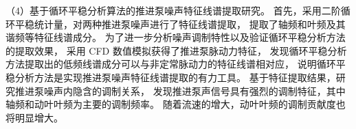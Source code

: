 （4）基于循环平稳分析算法的推进泵噪声特征线谱提取研究。
首先，采用二阶循环平稳统计量，对两种推进泵噪声进行了特征线谱提取，
提取了轴频和叶频及其谐频等特征线谱成分。
为了进一步分析噪声调制特性以及验证循环平稳分析方法的提取效果，
采用 CFD 数值模拟获得了推进泵脉动力特征，
发现循环平稳分析方法提取出的低频线谱成分可以与非定常脉动力的特征线谱相对应，
说明循环平稳分析方法是实现推进泵噪声特征线谱提取的有力工具。
基于特征提取结果，研究推进泵噪声内隐含的调制关系，
发现推进泵声信号具有强烈的调制特征，其中轴频和动叶叶频为主要的调制频率。
随着流速的增大，动叶叶频的调制贡献度也将明显增大。
\begin{comment}
（1）基于LabVIEW开发了推进泵噪声测试与分析系统。
其中涵盖了传感器、数据采集等硬件设计，以及信号分析、显示、存储等软件模块的设计。
该系统支持同步对多通道传感器信号实时采集，各通道信号同时分析、显示及存储，
具有操作简单、经济高效等优势。
基于系统的信号分析模块，可实现对噪声的频段能量分布特点、特征频段总声压量级、频谱特征等声纹特征分析。

（2）以紧凑型前置导叶的单级推进泵和新型结构的双级推进泵为研究对象，
在大型空泡水洞中对其分别开展了噪声试验。
在考虑背景噪声影响的基础上，
研究不同工况下推进泵噪声的声纹特征变化，
以及流速等与噪声的声学关联性。
结果表明，中低频段噪声对推进泵噪声有显著贡献。
噪声中低频段、高频段和全频段的总声压级随着流速的增大而增大，
流速变化对推进泵噪声能量分布和总声压级影响主要体现在中低频段。
两种形式的推进泵噪声频谱均表现为中低频线谱噪声、中低频宽带噪声和高频宽带噪声。

（3）开展了推进泵声信号的特性研究。
结合推进泵声信号产生的机理和声信号特征，对声信号进行了
组分分析。推进泵声信号成分主要包括确定性信号分量、调制信号分量和环境噪声信号分量。
基于推进泵声信号的循环平稳特性和各组分的特点，
对匀速运转工况下的无空化声信号建立了调幅调制信号模型，
采用循环平稳分析方法对声信号的仿真模型进行了研究，
验证了循环平稳解调算法提取多组分调制频率的有效性和良好的抗噪性能。
 
（4）推进泵噪声的特征线谱提取和分析。针对噪声特征线谱提取的需求，
基于循环平稳分析方法实现了推进泵低频线谱的提取。
为了验证循环平稳分析方法提取特征线谱的可行性，采用 CFD 数
值模拟获得了推进泵脉动力特征，
结果表明循环平稳分析方法提取出的低频线谱成分可以和非定常脉动力的特征线谱对应起来。
同时，对推进泵噪声的调制特性进行了研究，
发现推进泵声信号具有强烈的调制特征，其中轴频和动叶叶频为主要的调制频率。
随着流速的增大，动叶叶频的调制贡献度也愈发显著。
\section{创新点}
本文基于循环平稳分析理论，建立了低信噪比条件下推进泵噪声特征线谱提取的研究方法。
在大型空泡水洞对单级推进泵和双级推进泵开展了噪声试验研究，获得了低信噪比条件下的推进泵噪声。
基于循环平稳分析方法实现了推进泵特征线谱的提取，提取到了轴频和叶频及其谐频等低频线谱成分。
采用CFD数值模拟获得了推进泵脉动力特征，结果表明循环平稳分析方法提取出的低频线谱成分可以和非定常脉动力的特征线谱相对应，
验证循环平稳分析方法提取特征线谱的可行性。


\end{comment}
